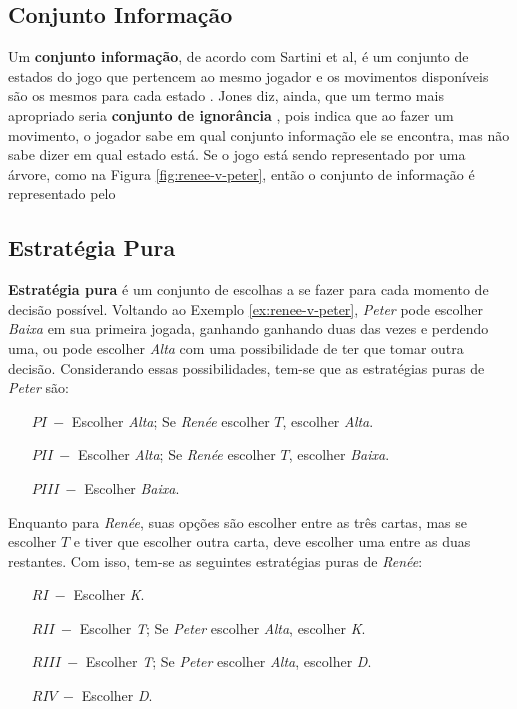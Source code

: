 \subsection{Conjunto Informação}
\label{subsec:conjunto-informacao}

Um \textbf{conjunto informação}, de acordo com Sartini et al, é um conjunto de estados do jogo que pertencem ao mesmo jogador e os movimentos disponíveis são os mesmos para cada estado \cite{sartini_IIbienaldasbm}. Jones diz, ainda, que um termo mais apropriado seria \textbf{conjunto de ignorância} \cite{jones_1980}, pois indica que ao fazer um movimento, o jogador sabe em qual conjunto informação ele se encontra, mas não sabe dizer em qual estado está. Se o jogo está sendo representado por uma árvore, como na Figura \ref{fig:renee-v-peter}, então o conjunto de informação é representado pelo

\subsection{Estratégia Pura}
\label{subsec:estrategia-pura}

\textbf{Estratégia pura} é um conjunto de escolhas a se fazer para cada momento de decisão possível. Voltando ao Exemplo \ref{ex:renee-v-peter}, \emph{Peter} pode escolher \emph{Baixa} em sua primeira jogada, ganhando ganhando duas das vezes e perdendo uma, ou pode escolher \emph{Alta} com uma possibilidade de ter que tomar outra decisão. Considerando essas possibilidades, tem-se que as estratégias puras de \emph{Peter} são:

\begin{enumerate}
	\tightlist
	\item[$ PI\ -$] Escolher \emph{Alta}; Se \emph{Renée} escolher $T$, escolher \emph{Alta}.
	\item[$ PII\ -$] Escolher \emph{Alta}; Se \emph{Renée} escolher $T$, escolher \emph{Baixa}.
	\item[$ PIII\ -$] Escolher \emph{Baixa}.
\end{enumerate}

Enquanto para \emph{Renée}, suas opções são escolher entre as três cartas, mas se escolher $T$ e tiver que escolher outra carta, deve escolher uma entre as duas restantes. Com isso, tem-se as seguintes estratégias puras de \emph{Renée}:

\begin{enumerate}
	\tightlist
	\item[$ RI\ -$] Escolher \emph{K}.
	\item[$ RII\ -$] Escolher \emph{T}; Se \emph{Peter} escolher \emph{Alta}, escolher \emph{K}.
	\item[$ RIII\ -$] Escolher \emph{T}; Se \emph{Peter} escolher \emph{Alta}, escolher \emph{D}.
	\item[$ RIV\ -$] Escolher \emph{D}.
\end{enumerate}

